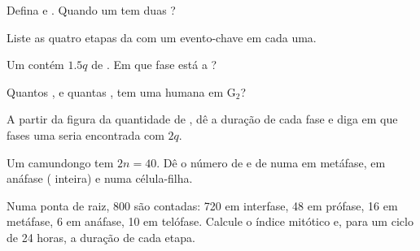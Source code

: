 \begin{exercise}[$\star$]\label{exo:g11:cell-cycle-mitosis:2}
Defina  e . Quando um  tem duas
?
\end{exercise}

\begin{exercise}[$\star$]\label{exo:g11:cell-cycle-mitosis:3}
Liste as quatro etapas da  com um evento-chave em cada uma.
\end{exercise}

\begin{exercise}[$\star$]\label{exo:g11:cell-cycle-mitosis:4}
Um  contém $1.5q$ de . Em que fase está a ?
\end{exercise}

\begin{exercise}[$\star$]\label{exo:g11:cell-cycle-mitosis:5}
Quantos , e quantas , tem uma  humana em
$\mathrm{G_2}$?
\end{exercise}

\begin{exercise}[$\star\star$]\label{exo:g11:cell-cycle-mitosis:6}
A partir da figura da quantidade de , dê a duração de cada fase e
diga em que fases uma  seria encontrada com $2q$.
\end{exercise}

\begin{exercise}[$\star\star$]\label{exo:g11:cell-cycle-mitosis:7}
Um camundongo tem $2n = 40$. Dê o número de  e de 
numa  em metáfase, em anáfase ( inteira) e numa
célula-filha.
\end{exercise}

\begin{exercise}[$\star\star$]\label{exo:g11:cell-cycle-mitosis:8}
Numa ponta de raiz, 800  são contadas: 720 em interfase, 48 em
prófase, 16 em metáfase, 6 em anáfase, 10 em telófase. Calcule o índice
mitótico e, para um ciclo de 24 horas, a duração de cada etapa.
\end{exercise}

